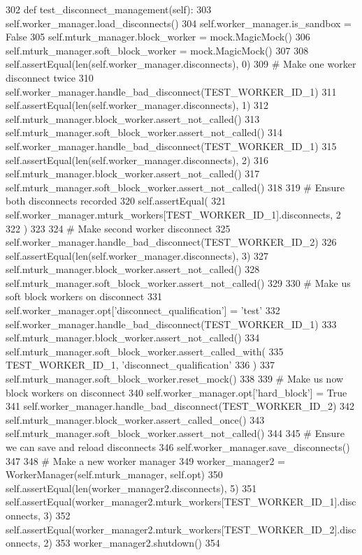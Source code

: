 \begin{DoxyCode}
302     \textcolor{keyword}{def }test\_disconnect\_management(self):
303         self.worker\_manager.load\_disconnects()
304         self.worker\_manager.is\_sandbox = \textcolor{keyword}{False}
305         self.mturk\_manager.block\_worker = mock.MagicMock()
306         self.mturk\_manager.soft\_block\_worker = mock.MagicMock()
307 
308         self.assertEqual(len(self.worker\_manager.disconnects), 0)
309         \textcolor{comment}{# Make one worker disconnect twice}
310         self.worker\_manager.handle\_bad\_disconnect(TEST\_WORKER\_ID\_1)
311         self.assertEqual(len(self.worker\_manager.disconnects), 1)
312         self.mturk\_manager.block\_worker.assert\_not\_called()
313         self.mturk\_manager.soft\_block\_worker.assert\_not\_called()
314         self.worker\_manager.handle\_bad\_disconnect(TEST\_WORKER\_ID\_1)
315         self.assertEqual(len(self.worker\_manager.disconnects), 2)
316         self.mturk\_manager.block\_worker.assert\_not\_called()
317         self.mturk\_manager.soft\_block\_worker.assert\_not\_called()
318 
319         \textcolor{comment}{# Ensure both disconnects recorded}
320         self.assertEqual(
321             self.worker\_manager.mturk\_workers[TEST\_WORKER\_ID\_1].disconnects, 2
322         )
323 
324         \textcolor{comment}{# Make second worker disconnect}
325         self.worker\_manager.handle\_bad\_disconnect(TEST\_WORKER\_ID\_2)
326         self.assertEqual(len(self.worker\_manager.disconnects), 3)
327         self.mturk\_manager.block\_worker.assert\_not\_called()
328         self.mturk\_manager.soft\_block\_worker.assert\_not\_called()
329 
330         \textcolor{comment}{# Make us soft block workers on disconnect}
331         self.worker\_manager.opt[\textcolor{stringliteral}{'disconnect\_qualification'}] = \textcolor{stringliteral}{'test'}
332         self.worker\_manager.handle\_bad\_disconnect(TEST\_WORKER\_ID\_1)
333         self.mturk\_manager.block\_worker.assert\_not\_called()
334         self.mturk\_manager.soft\_block\_worker.assert\_called\_with(
335             TEST\_WORKER\_ID\_1, \textcolor{stringliteral}{'disconnect\_qualification'}
336         )
337         self.mturk\_manager.soft\_block\_worker.reset\_mock()
338 
339         \textcolor{comment}{# Make us now block workers on disconnect}
340         self.worker\_manager.opt[\textcolor{stringliteral}{'hard\_block'}] = \textcolor{keyword}{True}
341         self.worker\_manager.handle\_bad\_disconnect(TEST\_WORKER\_ID\_2)
342         self.mturk\_manager.block\_worker.assert\_called\_once()
343         self.mturk\_manager.soft\_block\_worker.assert\_not\_called()
344 
345         \textcolor{comment}{# Ensure we can save and reload disconnects}
346         self.worker\_manager.save\_disconnects()
347 
348         \textcolor{comment}{# Make a new worker manager}
349         worker\_manager2 = WorkerManager(self.mturk\_manager, self.opt)
350         self.assertEqual(len(worker\_manager2.disconnects), 5)
351         self.assertEqual(worker\_manager2.mturk\_workers[TEST\_WORKER\_ID\_1].disconnects, 3)
352         self.assertEqual(worker\_manager2.mturk\_workers[TEST\_WORKER\_ID\_2].disconnects, 2)
353         worker\_manager2.shutdown()
354 
\end{DoxyCode}
